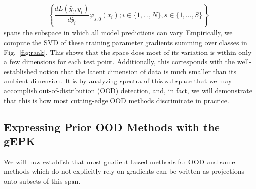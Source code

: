 \begin{align}
    \left\{\dfrac{dL(\hat y_i, y_i)}{d\hat y_i} \varphi_{s, 0}(x_i); i \in \{1,...,N\}, s \in \{1,...,S\}\right\}
\end{align}
spans the subspace in which all model predictions can vary. Empirically, we compute the SVD of these training parameter gradients summing over classes in Fig.~\ref{fig:rank}. This shows that the space does most of its variation is within only a few dimensions for each test point. Additionally, this corresponds with the well-established notion that the latent dimension of data is much smaller than its ambient dimension. It is by analyzing spectra of this subspace that we may accomplish out-of-distribution (OOD) detection, and, in fact, we will demonstrate that this is how most cutting-edge OOD methods discriminate in practice. 

\subsection{Expressing Prior OOD Methods with the gEPK}

 We will now establish that most gradient based methods for OOD and some methods which do not explicitly rely on gradients can be written as projections onto subsets of this span. 



